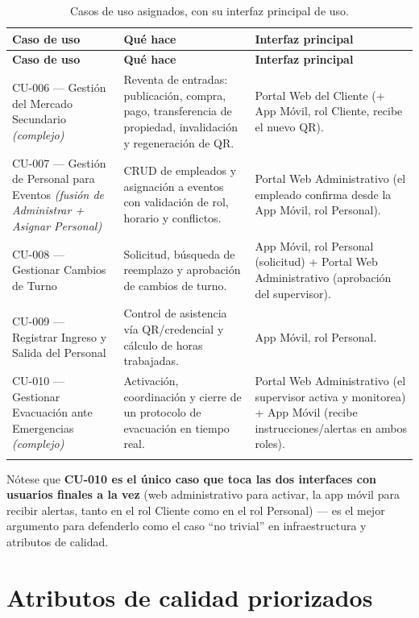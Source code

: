 \documentclass[12pt,a4paper]{article}
\begin{document}
\begin{longtable}{p{3.6cm}p{6.5cm}p{4.2cm}}
\toprule
\textbf{Caso de uso} & \textbf{Qué hace} & \textbf{Interfaz principal}\\
\midrule
\endfirsthead
\toprule
\textbf{Caso de uso} & \textbf{Qué hace} & \textbf{Interfaz principal}\\
\midrule
\endhead
CU-006 --- Gestión del Mercado Secundario \textit{(complejo)} &
Reventa de entradas: publicación, compra, pago, transferencia de propiedad, invalidación y
regeneración de QR. &
Portal Web del Cliente (+ App Móvil, rol Cliente, recibe el nuevo QR).\\[0.5em]
CU-007 --- Gestión de Personal para Eventos \textit{(fusión de Administrar + Asignar Personal)} &
CRUD de empleados y asignación a eventos con validación de rol, horario y conflictos. &
Portal Web Administrativo (el empleado confirma desde la App Móvil, rol Personal).\\[0.5em]
CU-008 --- Gestionar Cambios de Turno &
Solicitud, búsqueda de reemplazo y aprobación de cambios de turno. &
App Móvil, rol Personal (solicitud) + Portal Web Administrativo (aprobación del supervisor).\\[0.5em]
CU-009 --- Registrar Ingreso y Salida del Personal &
Control de asistencia vía QR/credencial y cálculo de horas trabajadas. &
App Móvil, rol Personal.\\[0.5em]
CU-010 --- Gestionar Evacuación ante Emergencias \textit{(complejo)} &
Activación, coordinación y cierre de un protocolo de evacuación en tiempo real. &
Portal Web Administrativo (el supervisor activa y monitorea) + App Móvil (recibe
instrucciones/alertas en ambos roles).\\
\bottomrule
\caption{Casos de uso asignados, con su interfaz principal de uso.}
\end{longtable}

Nótese que \textbf{CU-010 es el único caso que toca las dos interfaces con usuarios finales a la
vez} (web administrativo para activar, la app móvil para recibir alertas, tanto en el rol Cliente
como en el rol Personal) --- es el mejor argumento para defenderlo como el caso ``no trivial'' en
infraestructura y atributos de calidad.

\section{Atributos de calidad priorizados}
\end{document}
